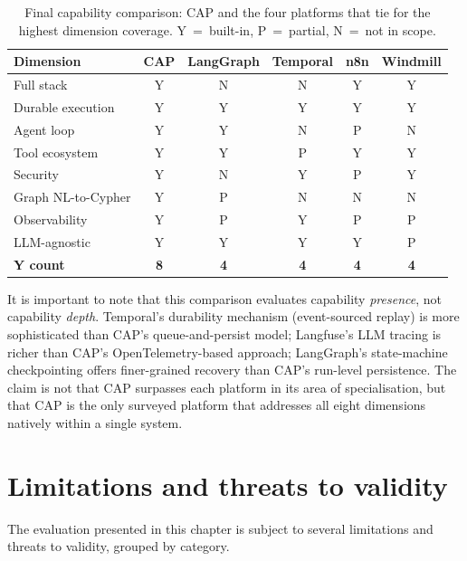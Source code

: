 \documentclass[a4paper]{sapthesis}
\begin{document}
\begin{table}[ht]
\centering
\caption{Final capability comparison: CAP and the four platforms that
tie for the highest dimension coverage.  Y~=~built-in, P~=~partial,
N~=~not in scope.}
\label{tab:final-comparison}
\small
\begin{tabular}{lccccc}
    \hline
    \textbf{Dimension} & \textbf{CAP} & \textbf{LangGraph} &
        \textbf{Temporal} & \textbf{n8n} & \textbf{Windmill} \\
    \hline
    Full stack         & Y & N & N & Y & Y \\
    Durable execution  & Y & Y & Y & Y & Y \\
    Agent loop         & Y & Y & N & P & N \\
    Tool ecosystem     & Y & Y & P & Y & Y \\
    Security           & Y & N & Y & P & Y \\
    Graph NL-to-Cypher & Y & P & N & N & N \\
    Observability      & Y & P & Y & P & P \\
    LLM-agnostic       & Y & Y & Y & Y & P \\
    \hline
    \textbf{Y count}   & \textbf{8} & \textbf{4} & \textbf{4} &
        \textbf{4} & \textbf{4} \\
    \hline
\end{tabular}
\end{table}

It is important to note that this comparison evaluates capability
\emph{presence}, not capability \emph{depth}.  Temporal's durability
mechanism (event-sourced replay) is more sophisticated than CAP's
queue-and-persist model; Langfuse's LLM tracing is richer than CAP's
OpenTelemetry-based approach; LangGraph's state-machine checkpointing
offers finer-grained recovery than CAP's run-level persistence.  The
claim is not that CAP surpasses each platform in its area of
specialisation, but that CAP is the only surveyed platform that
addresses all eight dimensions natively within a single system.


\section{Limitations and threats to validity}
\label{sec:limitations}

The evaluation presented in this chapter is subject to several
limitations and threats to validity, grouped by category.
\end{document}
